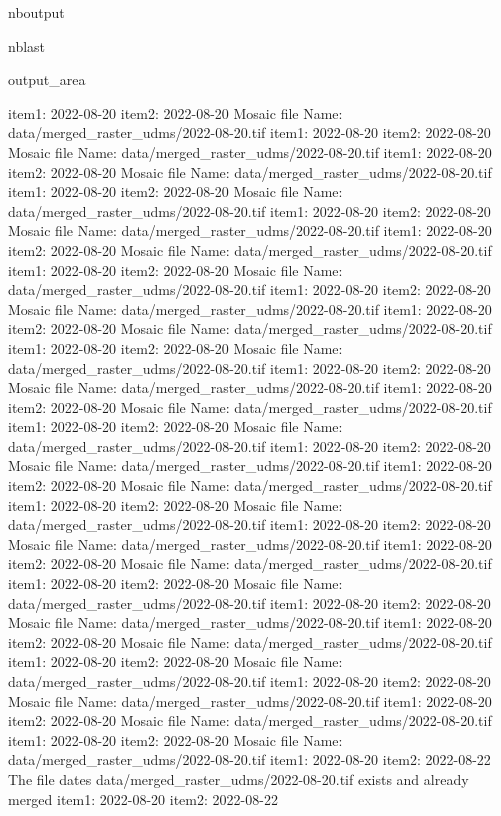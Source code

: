 \documentclass[letterpaper,10pt]{sphinxmanual}
\begin{document}
\begin{sphinxuseclass}{nboutput}
\begin{sphinxuseclass}{nblast}
{\begin{sphinxuseclass}{output_area}
\begin{sphinxuseclass}{}
\begin{sphinxVerbatim}[commandchars=\\\{\}]
item1:  2022-08-20
item2:  2022-08-20
Mosaic file Name:  data/merged\_raster\_udms/2022-08-20.tif
item1:  2022-08-20
item2:  2022-08-20
Mosaic file Name:  data/merged\_raster\_udms/2022-08-20.tif
item1:  2022-08-20
item2:  2022-08-20
Mosaic file Name:  data/merged\_raster\_udms/2022-08-20.tif
item1:  2022-08-20
item2:  2022-08-20
Mosaic file Name:  data/merged\_raster\_udms/2022-08-20.tif
item1:  2022-08-20
item2:  2022-08-20
Mosaic file Name:  data/merged\_raster\_udms/2022-08-20.tif
item1:  2022-08-20
item2:  2022-08-20
Mosaic file Name:  data/merged\_raster\_udms/2022-08-20.tif
item1:  2022-08-20
item2:  2022-08-20
Mosaic file Name:  data/merged\_raster\_udms/2022-08-20.tif
item1:  2022-08-20
item2:  2022-08-20
Mosaic file Name:  data/merged\_raster\_udms/2022-08-20.tif
item1:  2022-08-20
item2:  2022-08-20
Mosaic file Name:  data/merged\_raster\_udms/2022-08-20.tif
item1:  2022-08-20
item2:  2022-08-20
Mosaic file Name:  data/merged\_raster\_udms/2022-08-20.tif
item1:  2022-08-20
item2:  2022-08-20
Mosaic file Name:  data/merged\_raster\_udms/2022-08-20.tif
item1:  2022-08-20
item2:  2022-08-20
Mosaic file Name:  data/merged\_raster\_udms/2022-08-20.tif
item1:  2022-08-20
item2:  2022-08-20
Mosaic file Name:  data/merged\_raster\_udms/2022-08-20.tif
item1:  2022-08-20
item2:  2022-08-20
Mosaic file Name:  data/merged\_raster\_udms/2022-08-20.tif
item1:  2022-08-20
item2:  2022-08-20
Mosaic file Name:  data/merged\_raster\_udms/2022-08-20.tif
item1:  2022-08-20
item2:  2022-08-20
Mosaic file Name:  data/merged\_raster\_udms/2022-08-20.tif
item1:  2022-08-20
item2:  2022-08-20
Mosaic file Name:  data/merged\_raster\_udms/2022-08-20.tif
item1:  2022-08-20
item2:  2022-08-20
Mosaic file Name:  data/merged\_raster\_udms/2022-08-20.tif
item1:  2022-08-20
item2:  2022-08-20
Mosaic file Name:  data/merged\_raster\_udms/2022-08-20.tif
item1:  2022-08-20
item2:  2022-08-20
Mosaic file Name:  data/merged\_raster\_udms/2022-08-20.tif
item1:  2022-08-20
item2:  2022-08-20
Mosaic file Name:  data/merged\_raster\_udms/2022-08-20.tif
item1:  2022-08-20
item2:  2022-08-20
Mosaic file Name:  data/merged\_raster\_udms/2022-08-20.tif
item1:  2022-08-20
item2:  2022-08-20
Mosaic file Name:  data/merged\_raster\_udms/2022-08-20.tif
item1:  2022-08-20
item2:  2022-08-20
Mosaic file Name:  data/merged\_raster\_udms/2022-08-20.tif
item1:  2022-08-20
item2:  2022-08-20
Mosaic file Name:  data/merged\_raster\_udms/2022-08-20.tif
item1:  2022-08-20
item2:  2022-08-22
The file dates data/merged\_raster\_udms/2022-08-20.tif exists and already merged
item1:  2022-08-20
item2:  2022-08-22

\end{sphinxVerbatim}
\end{sphinxuseclass}
\end{sphinxuseclass}}
\end{sphinxuseclass}
\end{sphinxuseclass}
\end{document}
